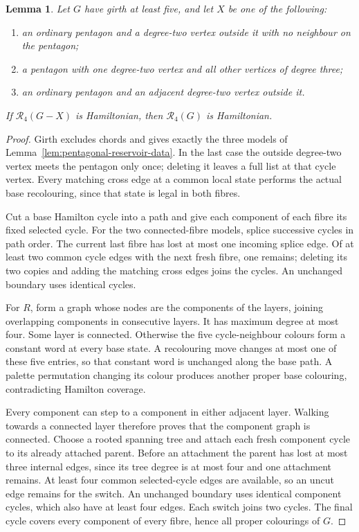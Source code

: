 \documentclass[11pt]{article}
\newtheorem{lemma}[theorem]{Lemma}
\theoremstyle{remark}
\newcommand{\R}{\mathcal R}
\numberwithin{equation}{section}
\numberwithin{table}{section}
\begin{document}
\begin{lemma}\label{lem:pentagonal-reservoirs}
Let $G$ have girth at least five, and let $X$ be one of the following:
\begin{enumerate}
\item an ordinary pentagon and a degree-two vertex outside it with no
neighbour on the pentagon;
\item a pentagon with one degree-two vertex and all other vertices of
degree three;
\item an ordinary pentagon and an adjacent degree-two vertex outside it.
\end{enumerate}
If $\R_4(G-X)$ is Hamiltonian, then $\R_4(G)$ is Hamiltonian.
\end{lemma}
\begin{proof}
Girth excludes chords and gives exactly the three models of
Lemma~\ref{lem:pentagonal-reservoir-data}. In the last case the outside
degree-two vertex meets the pentagon only once; deleting it leaves a full
list at that cycle vertex. Every matching cross edge at a common local
state performs the actual base recolouring, since that state is legal
in both fibres.

Cut a base Hamilton cycle into a path and give each component of each
fibre its fixed selected cycle. For the two connected-fibre models, splice
successive cycles in path order. The current last fibre has lost at most
one incoming splice edge. Of at least two common cycle edges with the next
fresh fibre, one remains; deleting its two copies and adding the matching
cross edges joins the cycles. An unchanged boundary uses identical cycles.

For $R$, form a graph whose nodes are the components of the layers, joining
overlapping components in consecutive layers. It has maximum degree at
most four. Some layer is connected. Otherwise the five cycle-neighbour
colours form a constant word at every base state. A recolouring move changes
at most one of these five entries, so that constant word is unchanged along
the base path. A palette permutation changing its colour produces another
proper base colouring, contradicting Hamilton coverage.

Every component can step to a component in either adjacent layer. Walking
towards a connected layer therefore proves that the component graph is
connected. Choose a rooted spanning tree and attach each fresh component
cycle to its already attached parent. Before an attachment the parent has
lost at most three internal edges, since its tree degree is at most four
and one attachment remains. At least four common selected-cycle edges are
available, so an uncut edge remains for the switch. An unchanged boundary
uses identical component cycles, which also have at least four edges.
Each switch joins two cycles. The final cycle covers every component of
every fibre, hence all proper colourings of $G$.
\end{proof}
\end{document}
